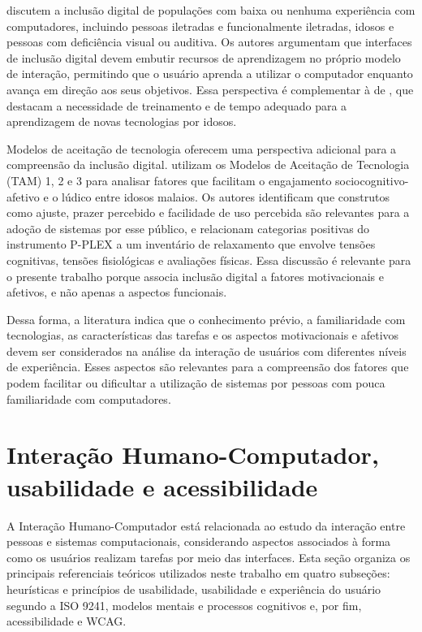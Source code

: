 \cite{filgueiras2009recoverability} discutem a inclusão digital de populações com baixa ou nenhuma experiência com computadores, incluindo pessoas iletradas e funcionalmente iletradas, idosos e pessoas com deficiência visual ou auditiva. Os autores argumentam que interfaces de inclusão digital devem embutir recursos de aprendizagem no próprio modelo de interação, permitindo que o usuário aprenda a utilizar o computador enquanto avança em direção aos seus objetivos. Essa perspectiva é complementar à de \cite{ahmad2013teaching}, que destacam a necessidade de treinamento e de tempo adequado para a aprendizagem de novas tecnologias por idosos.

Modelos de aceitação de tecnologia oferecem uma perspectiva adicional para a compreensão da inclusão digital. \cite{lee2021factors} utilizam os Modelos de Aceitação de Tecnologia (TAM) 1, 2 e 3 para analisar fatores que facilitam o engajamento sociocognitivo-afetivo e o lúdico entre idosos malaios. Os autores identificam que construtos como ajuste, prazer percebido e facilidade de uso percebida são relevantes para a adoção de sistemas por esse público, e relacionam categorias positivas do instrumento P-PLEX a um inventário de relaxamento que envolve tensões cognitivas, tensões fisiológicas e avaliações físicas. Essa discussão é relevante para o presente trabalho porque associa inclusão digital a fatores motivacionais e afetivos, e não apenas a aspectos funcionais.

Dessa forma, a literatura indica que o conhecimento prévio, a familiaridade com tecnologias, as características das tarefas e os aspectos motivacionais e afetivos devem ser considerados na análise da interação de usuários com diferentes níveis de experiência. Esses aspectos são relevantes para a compreensão dos fatores que podem facilitar ou dificultar a utilização de sistemas por pessoas com pouca familiaridade com computadores.

\section{Interação Humano-Computador, usabilidade e acessibilidade}

\label{sec:ihc}

A Interação Humano-Computador está relacionada ao estudo da interação entre pessoas e sistemas computacionais, considerando aspectos associados à forma como os usuários realizam tarefas por meio das interfaces. Esta seção organiza os principais referenciais teóricos utilizados neste trabalho em quatro subseções: heurísticas e princípios de usabilidade, usabilidade e experiência do usuário segundo a ISO 9241, modelos mentais e processos cognitivos e, por fim, acessibilidade e WCAG.


